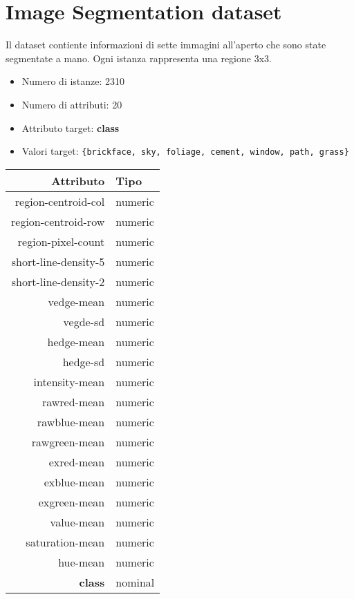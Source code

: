 \pagebreak 

\section{Image Segmentation dataset}

Il dataset contiente informazioni di sette immagini all'aperto che sono state segmentate a mano. Ogni istanza rappresenta una regione 3x3.

\begin{itemize}
	\item Numero di istanze: 2310
	\item Numero di attributi: 20
	\item Attributo target: \textbf{class}
	\item Valori target: \texttt{\{brickface, sky, foliage, cement, window, path, grass\}}
\end{itemize}

\begin{table}[!htb]
	\centering
	\begin{tabular}{|r|l|}
		\hline
		Attributo & Tipo \\
		\hline
		region-centroid-col & numeric \\ 
		region-centroid-row & numeric \\ 
		region-pixel-count & numeric \\ 
		short-line-density-5 & numeric \\ 
		short-line-density-2 & numeric \\ 
		vedge-mean & numeric \\ 
		vegde-sd & numeric \\ 
		hedge-mean & numeric \\ 
		hedge-sd & numeric \\ 
		intensity-mean & numeric \\ 
		rawred-mean & numeric \\ 
		rawblue-mean & numeric \\ 
		rawgreen-mean & numeric \\ 
		exred-mean & numeric \\ 
		exblue-mean & numeric \\ 
		exgreen-mean & numeric \\ 
		value-mean & numeric \\ 
		saturation-mean & numeric \\ 
		hue-mean & numeric \\ 
		\textbf{class} & nominal \\ 
		\hline
	\end{tabular}
\end{table}

